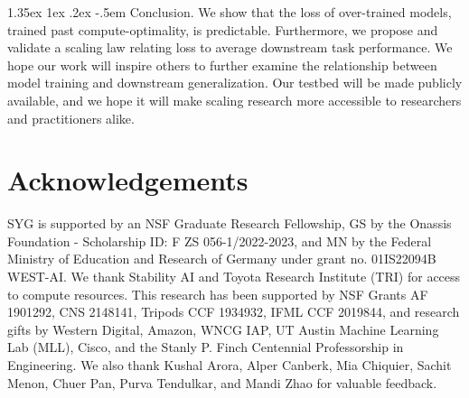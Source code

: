 \documentclass[dvipsnames,11pt]{article}
\makeatletter
\renewcommand\paragraph{\@startsection{paragraph}{4}{\z@}                                     {1.35ex \@plus1ex \@minus.2ex}                                {-.5em}
{\normalfont\normalsize\bfseries}}
\makeatother
\begin{document}
\paragraph{Conclusion.}
We show that the loss of over-trained models, trained past compute-optimality, is predictable. Furthermore, we propose and validate a scaling law relating loss to average downstream task performance.
We hope our work will inspire others to further examine the relationship between model training and downstream generalization.
Our testbed will be made publicly available, and we hope it will make scaling research more accessible to researchers and practitioners alike.

\section*{Acknowledgements}
SYG is supported by an NSF Graduate Research Fellowship,
GS by the Onassis Foundation - Scholarship ID: F ZS 056-1/2022-2023, and MN by the Federal Ministry of Education and Research of Germany under grant no. 01IS22094B WEST-AI.
We thank Stability AI and Toyota Research Institute (TRI) for access to compute resources.
This research has been supported by NSF Grants AF 1901292, CNS 2148141, Tripods CCF 1934932, IFML CCF 2019844, and research gifts by Western Digital, Amazon, WNCG IAP, UT Austin Machine Learning Lab (MLL), Cisco, and the Stanly P. Finch Centennial Professorship in Engineering.
We also thank Kushal Arora, Alper Canberk, Mia Chiquier, Sachit Menon, Chuer Pan, Purva Tendulkar, and Mandi Zhao for valuable feedback.

\clearpage




\clearpage
\end{document}
